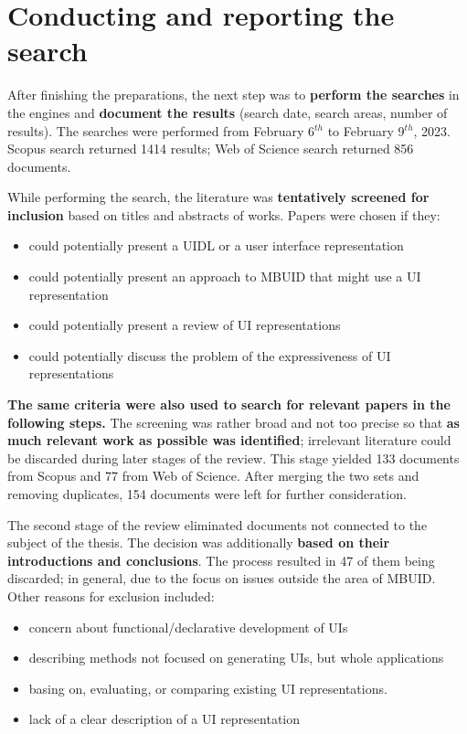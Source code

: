 \section{Conducting and reporting the search}\label{sec:conducting-and-reporting-the-search}


After finishing the preparations, the next step was to \textbf{perform the searches} in the engines and \textbf{document the results} (search date, search areas, number of results).
The searches were performed from February 6$^{th}$ to February 9$^{th}$, 2023.
Scopus search returned 1414 results;
Web of Science search returned 856 documents.

While performing the search, the literature was \textbf{tentatively screened for inclusion} based on titles and abstracts of works.
Papers were chosen if they:
\begin{itemize}
    \item could potentially present a UIDL or a user interface representation
    \item could potentially present an approach to MBUID that might use a UI representation
    \item could potentially present a review of UI representations
    \item could potentially discuss the problem of the expressiveness of UI representations
\end{itemize}
\textbf{The same criteria were also used to search for relevant papers in the following steps.}
The screening was rather broad and not too precise so that \textbf{as much relevant work as possible was identified};
irrelevant literature could be discarded during later stages of the review.
This stage yielded 133 documents from Scopus and 77 from Web of Science.
After merging the two sets and removing duplicates, 154 documents were left for further consideration.

The second stage of the review eliminated documents not connected to the subject of the thesis.
The decision was additionally \textbf{based on their introductions and conclusions}.
The process resulted in 47 of them being discarded; in general, due to the focus on issues outside the area of MBUID\@.
Other reasons for exclusion included:
\begin{itemize}
    \item concern about functional/declarative development of UIs
    \item describing methods not focused on generating UIs, but whole applications
    \item basing on, evaluating, or comparing existing UI representations.
    \item lack of a clear description of a UI representation
\end{itemize}

